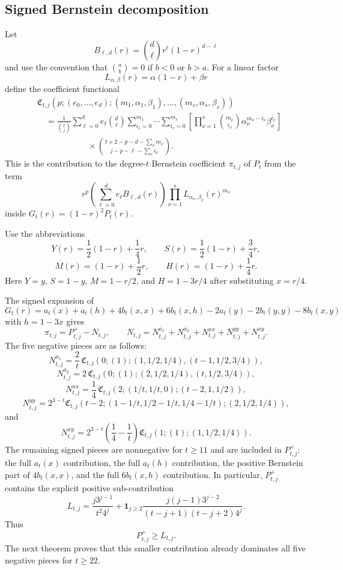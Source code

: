 \documentclass[11pt]{article}
\theoremstyle{definition}
\begin{document}
\subsection{Signed Bernstein decomposition}\label{subsec:signed-bernstein}

Let
\[
  B_{\ell,d}(r)=\binom d\ell r^\ell(1-r)^{d-\ell}
\]
and use the convention that $\binom ab=0$ if $b<0$ or $b>a$.  For a
linear factor
\[
  L_{\alpha,\beta}(r)=\alpha(1-r)+\beta r
\]
define the coefficient functional
\[
\begin{aligned}
&\mathfrak C_{t,j}
\left(p;(e_0,\ldots,e_d);
(m_1,\alpha_1,\beta_1),\ldots,(m_s,\alpha_s,\beta_s)\right)\\
&\quad =
\frac1{\binom tj}
\sum_{\ell=0}^{d} e_\ell\binom d\ell
\sum_{i_1=0}^{m_1}\cdots\sum_{i_s=0}^{m_s}
\left[
\prod_{\nu=1}^s
\binom{m_\nu}{i_\nu}
\alpha_\nu^{m_\nu-i_\nu}
\beta_\nu^{i_\nu}
\right]\\
&\qquad\qquad\qquad\times
\binom{t+2-p-d-\sum_\nu m_\nu}
      {j-p-\ell-\sum_\nu i_\nu}.
\end{aligned}
\]
This is the contribution to the degree-$t$ Bernstein coefficient
$\pi_{t,j}$ of $P_t$ from the term
\[
  r^p\left(\sum_{\ell=0}^d e_\ell B_{\ell,d}(r)\right)
  \prod_{\nu=1}^s L_{\alpha_\nu,\beta_\nu}(r)^{m_\nu}
\]
inside $G_t(r)=(1-r)^2P_t(r)$.

Use the abbreviations
\[
  Y(r)=\frac12(1-r)+\frac14r,
  \qquad
  S(r)=\frac12(1-r)+\frac34r,
\]
\[
  M(r)=(1-r)+\frac12r,
  \qquad
  H(r)=(1-r)+\frac14r.
\]
Here $Y=y$, $S=1-y$, $M=1-r/2$, and $H=1-3r/4$ after substituting
$x=r/4$.

The signed expansion of
\[
  G_t(r)=a_t(x)+a_t(h)+4b_t(x,x)+6b_t(x,h)-2a_t(y)-2b_t(y,y)-8b_t(x,y)
\]
with $h=1-3x$ gives
\[
  \pi_{t,j}=P^+_{t,j}-N_{t,j},
  \qquad
  N_{t,j}=N^{a_1}_{t,j}+N^{a_2}_{t,j}
          +N^{xx}_{t,j}+N^{yy}_{t,j}+N^{xy}_{t,j}.
\]
The five negative pieces are as follows:
\[
  N^{a_1}_{t,j}
  =
  \frac2t\,
  \mathfrak C_{t,j}
  \left(0;(1);(1,1/2,1/4),(t-1,1/2,3/4)\right),
\]
\[
  N^{a_2}_{t,j}
  =
  2\,
  \mathfrak C_{t,j}
  \left(0;(1);(2,1/2,1/4),(t,1/2,3/4)\right),
\]
\[
  N^{xx}_{t,j}
  =
  \frac14\,
  \mathfrak C_{t,j}
  \left(2;(1/t,1/t,0);(t-2,1,1/2)\right),
\]
\[
  N^{yy}_{t,j}
  =
  2^{3-t}
  \mathfrak C_{t,j}
  \left(t-2;(1-1/t,1/2-1/t,1/4-1/t);(2,1/2,1/4)\right),
\]
and
\[
  N^{xy}_{t,j}
  =
  2^{3-t}\left(\frac14-\frac1t\right)
  \mathfrak C_{t,j}
  \left(1;(1);(1,1/2,1/4)\right).
\]
The remaining signed pieces are nonnegative for $t\ge11$ and are included
in $P^+_{t,j}$: the full $a_t(x)$ contribution, the full $a_t(h)$
contribution, the positive Bernstein part of $4b_t(x,x)$, and the full
$6b_t(x,h)$ contribution.  In particular, $P^+_{t,j}$ contains the
explicit positive sub-contribution
\[
  L_{t,j}
  =
  \frac{j3^{j-1}}{t^2 4^j}
  +\mathbf 1_{j\ge2}
   \frac{j(j-1)3^{j-2}}{(t-j+1)(t-j+2)4^j}.
\]
Thus
\[
  P^+_{t,j}\ge L_{t,j}.
\]
The next theorem proves that this smaller contribution already dominates
all five negative pieces for $t\ge22$.
\end{document}
